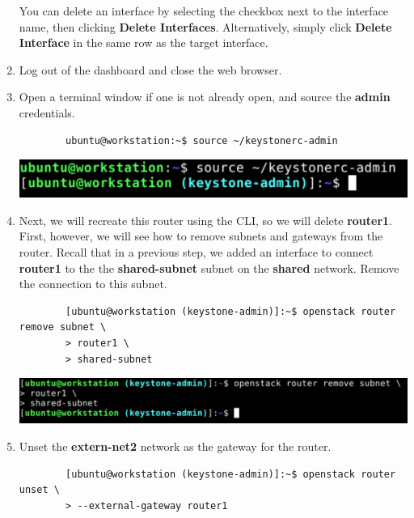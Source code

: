 \documentclass[letterpaper, 12pt]{article}
\begin{document}
\begin{enumerate}
    \begin{tipbox}
        You can delete an interface by selecting the checkbox next to the interface name, then clicking \textbf{Delete
        Interfaces}. Alternatively, simply click \textbf{Delete Interface} in the same row as the target interface.
    \end{tipbox}

    \item Log out of the dashboard and close the web browser.
    
    \item Open a terminal window if one is not already open, and source the \textbf{admin} credentials.
    \begin{lstlisting}
        ubuntu@workstation:~$ source ~/keystonerc-admin
    \end{lstlisting}

    \begin{center}
        \includegraphics[width=\linewidth]{images/part2/step8.png}
    \end{center}

    \item Next, we will recreate this router using the CLI, so we will delete \textbf{router1}. First, however, we will
    see how to remove subnets and gateways from the router. Recall that in a previous step, we added an interface to
    connect \textbf{router1} to the the \textbf{shared-subnet} subnet on the \textbf{shared} network. Remove the
    connection to this subnet.
    \begin{lstlisting}
        [ubuntu@workstation (keystone-admin)]:~$ openstack router remove subnet \
        > router1 \
        > shared-subnet
    \end{lstlisting}

    \begin{center}
        \includegraphics[width=\linewidth]{images/part2/step9.png}
    \end{center}

    \item Unset the \textbf{extern-net2} network as the gateway for the router.
    \begin{lstlisting}
        [ubuntu@workstation (keystone-admin)]:~$ openstack router unset \
        > --external-gateway router1
    \end{lstlisting}


\end{enumerate}
\end{document}
